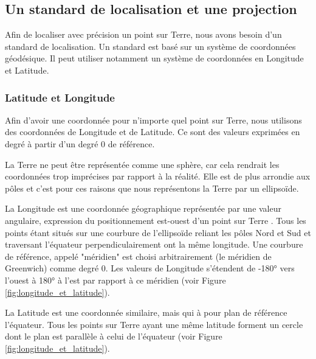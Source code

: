 \documentclass{article}
\begin{document}
\subsection{Un standard de localisation et une projection}

Afin de localiser avec précision un point sur Terre, nous avons besoin d'un standard de localisation. Un standard est basé sur un système de coordonnées géodésique. Il peut utiliser notamment un système de coordonnées en Longitude et Latitude.

\subsubsection{Latitude et Longitude}

Afin d'avoir une coordonnée pour n'importe quel point sur Terre, nous utilisons des coordonnées de Longitude et de Latitude. Ce sont des valeurs exprimées en degré à partir d'un degré 0 de référence.

La Terre ne peut être représentée comme une sphère, car cela rendrait les coordonnées trop imprécises par rapport à la réalité. Elle est de plus arrondie aux pôles et c'est pour ces raisons que nous représentons la Terre par un ellipsoïde. 

La Longitude est une coordonnée géographique représentée par une valeur angulaire, expression du positionnement est-ouest d'un point sur Terre \cite{frwiki:188614923}. Tous les points étant situés sur une courbure de l'ellipsoïde reliant les pôles Nord et Sud et traversant l'équateur perpendiculairement ont la même longitude. Une courbure de référence, appelé "méridien" est choisi arbitrairement (le méridien de Greenwich) comme degré 0. Les valeurs de Longitude s'étendent de -180° vers l'ouest à 180° à l'est par rapport à ce méridien (voir Figure \ref{fig:longitude_et_latitude}). 

La Latitude est une coordonnée similaire, mais qui à pour plan de référence l'équateur. Tous les points sur Terre ayant une même latitude forment un cercle dont le plan est parallèle à celui de l'équateur \cite{frwiki:189341688} (voir Figure \ref{fig:longitude_et_latitude}). 
\end{document}

